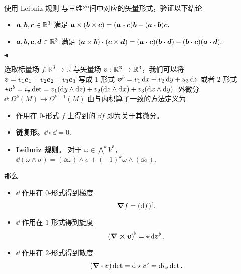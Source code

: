 \documentclass[11pt]{article}
\newenvironment{question}[2][Question]{\begin{trivlist}
\item[\hskip \labelsep {\bfseries #1}\hskip \labelsep {\bfseries #2.}]}{\hfill$\blacktriangleleft$\end{trivlist}}
\newcommand{\RR}{\mathbb{R}}
\begin{document}
    \begin{question}{4 (9') (内积)}~\\
    使用 Leibniz 规则 与三维空间中对应的矢量形式，验证以下结论
    \begin{itemize}
        \item [a (4')] $\vb*{a}, \vb*{b}, \vb*{c} \in \RR^3$ 满足 $\vb*{a}\times(\vb*{b} \times \vb*{c}) = (\vb*{a} \vdot \vb*{c})\vb*{b} - (\vb*{a} \vdot \vb*{b})\vb*{c}.$
        \item [b (5')] $\vb*{a}, \vb*{b}, \vb*{c}, \vb*{d} \in \RR^3$ 满足 $(\vb*{a} \times \vb*{b})\vdot(\vb*{c} \times \vb*{d}) = (\vb*{a} \vdot \vb*{c})(\vb*{b} \vdot \vb*{d}) - (\vb*{b} \vdot \vb*{c})(\vb*{a} \vdot \vb*{d}).$
    \end{itemize}

    \end{question}

    选取标量场 $f: \RR^3 \to \RR$ 与矢量场 $\vb*{v}: \RR^3 \to \RR^3$，我们可以将 $\vb*{v} = v_1\vb*{e}_1 + v_2\vb*{e}_2 + v_3\vb*{e}_3$ 写成 $1$-形式 $\vb*{v}^b = v_1 \dd{x} + v_2 \dd{y} + u_3\dd{z}$ 或者 $2$-形式 $\star \vb*{v}^b = i_{\vb*{v}} \det = v_1\qty(\dd{y} \wedge \dd{z}) + v_2\qty(\dd{z} \wedge \dd{x}) + v_3\qty(\dd{x} \wedge \dd{y}).$
    外微分 $\dd{}: \Omega^k(M) \to \Omega^{k+1}(M)$ 由与内积算子一致的方法定义为
    \begin{itemize}
        \item 作用在 $0$-形式 $f$ 上得到的 $\dd{f}$ 即为关于其微分。
        \item \textbf{链复形}。$\dd{} \circ \dd{} = 0.$
        \item \textbf{Leibniz 规则}。 对于 $\omega \in \bigwedge^k V^*$，$\dd{(\omega  \wedge \sigma)} = (\dd{\omega}) \wedge \sigma + (-1)^k \omega \wedge (\dd{\sigma}).$
    \end{itemize}
    那么
    \begin{itemize}
        \item $\dd{}$ 作用在 $0$-形式得到梯度
        \[ \grad f = (\dd{f})^{\sharp}. \]
        \item $\dd{}$ 作用在 $1$-形式得到旋度
        \[ \qty(\curl \vb*{v})^{\flat} = \star \dd{\vb*{v}^{\flat}}. \]
        \item $\dd{}$ 作用在 $2$-形式得到散度
        \[ \qty(\div \vb*{v}) \det = \dd{\star \vb*{v}^{\flat}} = \dd{i_{\vb*{v}} \det}. \]
    \end{itemize}
    
\end{document}
